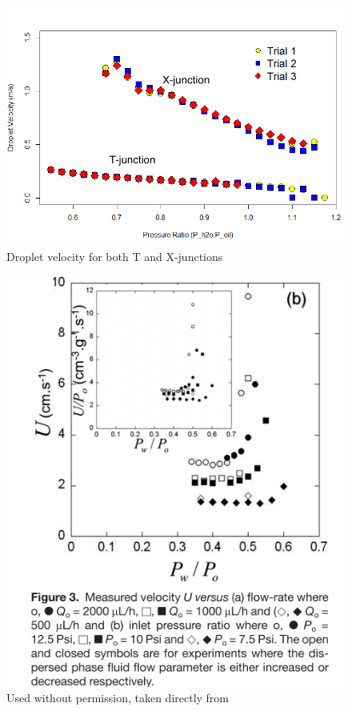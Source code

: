 \begin{figure}[h]
\centering 
\includegraphics[width=01.0\columnwidth]{vel_pr.PNG} 
\caption[Droplet Velocity as a function of Applied Control Pressure Ratio]{Droplet velocity for both T and X-junctions }
\label{fig:vel_pr} 
\end{figure}


\begin{figure}[h]
\centering 
\includegraphics[width=0.75\columnwidth]{wardVelocity.PNG} 
\caption[Velocity, U as a function of applied pressure]{Used without permission, taken directly from \cite{Ward2005} }
\label{fig:wardVelocity} 
\end{figure}

